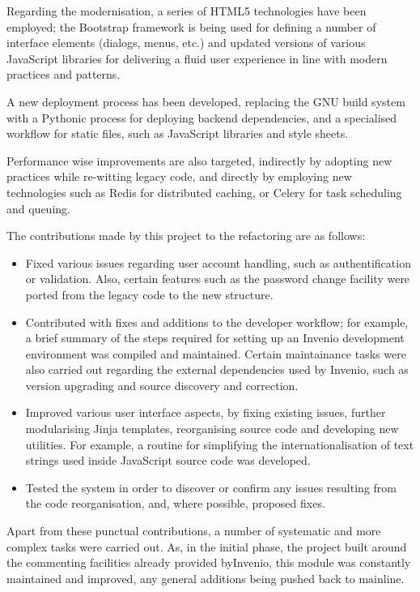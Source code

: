 Regarding the modernisation, a series of HTML5 technologies have been employed;
the Bootstrap \cite{ref:boostrap} framework is being used for defining a number
of interface elements (dialogs, menus, etc.) and updated versions of various
JavaScript libraries for delivering a fluid user experience in line with modern
practices and patterns.

A new deployment process has been developed, replacing the GNU build system
with a Pythonic process for deploying backend dependencies, and a specialised
workflow for static files, such as JavaScript libraries and style sheets.

Performance wise improvements are also targeted, indirectly by adopting new
practices while re-witting legacy code, and directly by employing new
technologies such as Redis \cite{ref:redis} for distributed caching, or Celery
\cite{ref:celery} for task scheduling and queuing.

The contributions made by this project to the refactoring are as follows:
\begin{itemize}
  \item Fixed various issues regarding user account handling, such as
        authentification or validation. Also, certain features such as the
        password change facility were ported from the legacy code to the new
        structure.
  \item Contributed with fixes and additions to the developer workflow; for
        example, a brief summary of the steps required for setting up an Invenio
        development environment was compiled and maintained. Certain
        maintainance tasks were also carried out regarding the external
        dependencies used by Invenio, such as version upgrading and source
        discovery and correction.
  \item Improved various user interface aspects, by fixing existing issues,
        further modularising Jinja templates, reorganising source code and
        developing new utilities. For example, a routine for simplifying the
        internationalisation of text strings used inside JavaScript source code
        was developed.
  \item Tested the system in order to discover or confirm any issues resulting
        from the code reorganisation, and, where possible, proposed fixes.
\end{itemize}

Apart from these punctual contributions, a number of systematic and more
complex tasks were carried out. As, in the initial phase, the project built
around the commenting facilities already provided byInvenio, this module was
constantly maintained and improved, any general additions being pushed
back to mainline.

